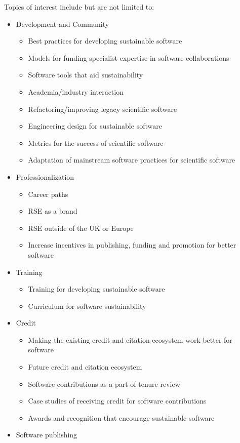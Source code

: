 \documentclass[11pt]{article}
\newenvironment{shortlist}{
        \vspace*{-0.8em}
  \begin{itemize}
  \setlength{\itemsep}{-0.3em}
}{
  \end{itemize}
        \vspace*{-0.6em}
}
\begin{document}
Topics of interest include but are not limited to:
\begin{shortlist}
\item Development and Community
\begin{shortlist}
\item Best practices for developing sustainable software
\item Models for funding specialist expertise in software collaborations
\item Software tools that aid sustainability
\item Academia/industry interaction
\item Refactoring/improving legacy scientific software
\item Engineering design for sustainable software
\item Metrics for the success of scientific software
\item Adaptation of mainstream software practices for scientific software
\end{shortlist}
\item Professionalization
\begin{shortlist}
\item Career paths
\item RSE as a brand
\item RSE outside of the UK or Europe
\item Increase incentives in publishing, funding and promotion for better software
\end{shortlist}
\item Training
\begin{shortlist}
\item Training for developing sustainable software
\item Curriculum for software sustainability
\end{shortlist}
\item Credit
\begin{shortlist}
\item Making the existing credit and citation ecosystem work better for software
\item Future credit and citation ecosystem
\item Software contributions as a part of tenure review
\item Case studies of receiving credit for software contributions
\item Awards and recognition that encourage sustainable software
\end{shortlist}
\item Software publishing

\end{shortlist}
\end{document}
